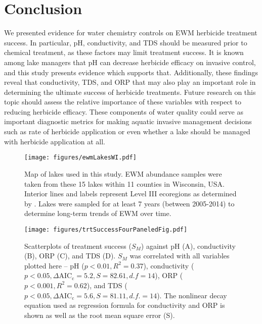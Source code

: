 \documentclass{article}
\begin{document}
\section*{Conclusion}
We presented evidence for water chemistry controls on EWM herbicide treatment success. In particular, pH, conductivity, and TDS should be measured prior to chemical treatment, as these factors may limit treatment success. It is known among lake managers that pH can decrease herbicide efficacy on invasive control, and this study presents evidence which supports that. Additionally, these findings reveal that conductivity, TDS, and ORP that may also play an important role in determining the ultimate success of herbicide treatments. Future research on this topic should assess the relative importance of these variables with respect to reducing herbicide efficacy. These components of water quality could serve as important diagnostic metrics for making aquatic invasive management decisions such as rate of herbicide application or even whether a lake should be managed with herbicide application at all.

\nolinenumbers

\newpage
\begin{figure}[h]
	\centering
	\texttt{[image: figures/ewmLakesWI.pdf]}
	\captionsetup{justification=raggedright}
	\caption{Map of lakes used in this study. EWM abundance samples were taken from these 15 lakes within 11 counties in Wisconsin, USA. Interior lines and labels represent Level III ecoregions as determined by \citet{Omernik1987}. Lakes were sampled for at least 7 years (between 2005-2014) to determine long-term trends of EWM over time.}
	\label{fig:map}
\end{figure}

\begin{figure}[h]
	\centering
	\texttt{[image: figures/trtSuccessFourPaneledFig.pdf]}
	\captionsetup{justification=raggedright}
	\caption{Scatterplots of treatment success ($S_{M}$) against pH (A), conductivity (B), ORP (C), and TDS (D). $S_{M}$ was correlated with all variables plotted here -- pH ($p < 0.01, R^2 = 0.37$), conductivity ($p < 0.05, \Delta\mathrm{AIC_{c}} = 5.2, S = 82.61, d.f = 14$), ORP ($p<0.001, R^{2}=0.62$), and TDS ($p<0.05, \Delta\mathrm{AIC_{c}}=5.6, S = 81.11, d.f. = 14$). The nonlinear decay equation used as regression formula for conductivity and ORP is shown as well as the root mean square error (S).}
	\label{fig:trtSuccessPanels}
\end{figure}
\end{document}
